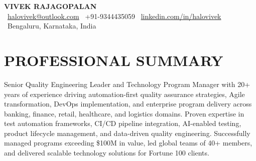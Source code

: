 \documentclass[11pt,a4paper]{article}
\begin{document}
\begin{center}
    {\Huge\bfseries\color{headercolor} VIVEK RAJAGOPALAN}\\[0.5em]
    \faEnvelope\ \href{mailto:halovivek@outlook.com}{halovivek@outlook.com} \quad
    \faPhone\ +91-9344435059 \quad
    \faLinkedin\ \href{https://linkedin.com/in/halovivek}{linkedin.com/in/halovivek}\\
    \faMapMarker\ Bengaluru, Karnataka, India
\end{center}

\vspace{0.5em}

\section*{PROFESSIONAL SUMMARY}
Senior Quality Engineering Leader and Technology Program Manager with 20+ years of experience driving automation-first quality assurance strategies, Agile transformation, DevOps implementation, and enterprise program delivery across banking, finance, retail, healthcare, and logistics domains. Proven expertise in test automation frameworks, CI/CD pipeline integration, AI-enabled testing, product lifecycle management, and data-driven quality engineering. Successfully managed programs exceeding \$100M in value, led global teams of 40+ members, and delivered scalable technology solutions for Fortune 100 clients.

\end{document}
